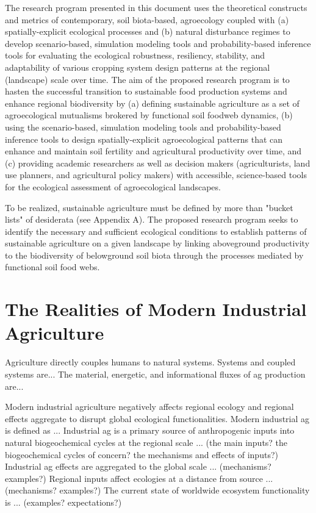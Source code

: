 The research program presented in this document uses the theoretical constructs and metrics of contemporary, soil biota-based, agroecology coupled with (a) spatially-explicit ecological processes and (b) natural disturbance regimes to develop scenario-based, simulation modeling tools and probability-based inference tools for evaluating the ecological robustness, resiliency, stability, and adaptability of various cropping system design patterns at the regional (landscape) scale over time. The aim of the proposed research program is to hasten the successful transition to sustainable food production systems and enhance regional biodiversity by (a) defining sustainable agriculture as a set of agroecological mutualisms brokered by functional soil foodweb dynamics, (b) using the scenario-based, simulation modeling tools and probability-based inference tools to design spatially-explicit agroecological patterns that can enhance and maintain soil fertility and agricultural productivity over time, and (c) providing academic researchers as well as decision makers (agriculturists, land use planners, and agricultural policy makers) with accessible, science-based tools for the ecological assessment of agroecological landscapes.

To be realized, sustainable agriculture must be defined by more than "bucket lists" of desiderata (see Appendix A). The proposed research program seeks to identify the necessary and sufficient ecological conditions to establish patterns of sustainable agriculture on a given landscape by linking aboveground productivity to the biodiversity of belowground  soil biota through the processes mediated by functional soil food webs. 


\section{The Realities of Modern Industrial Agriculture}
\begin{outline}
\noindent \0 Agriculture directly couples humans to natural systems.
\1 Systems and coupled systems are...
\1 The material, energetic, and informational fluxes of ag production are...

\0 Modern industrial agriculture negatively affects regional ecology and regional effects aggregate to disrupt global ecological functionalities.
\1 Modern industrial ag is defined as ...
\1 Industrial ag is a primary source of anthropogenic inputs into natural biogeochemical cycles at the regional scale ... (the main inputs? the biogeochemical cycles of concern? the mechanisms and effects of inputs?)
\1 Industrial ag effects are aggregated to the global scale ... (mechanisms? examples?) 
\1 Regional inputs affect ecologies at a distance from source ... (mechanisms? examples?)
\1 The current state of worldwide ecosystem functionality is ... (examples? expectations?)
\end{outline}



